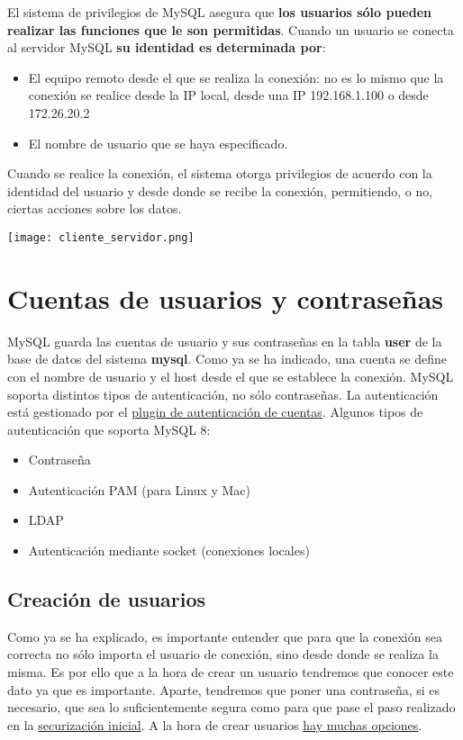 El sistema de privilegios de MySQL asegura que \textbf{los usuarios sólo pueden realizar las funciones que le son permitidas}. Cuando un usuario se conecta al servidor MySQL \textbf{su identidad es determinada por}:

\begin{itemize}
    \item El equipo remoto desde el que se realiza la conexión: no es lo mismo que la conexión se realice desde la IP local, desde una IP 192.168.1.100 o desde 172.26.20.2
    \item El nombre de usuario que se haya especificado.
\end{itemize}

Cuando se realice la conexión, el sistema otorga privilegios de acuerdo con la  identidad del usuario y desde donde se recibe la conexión, permitiendo, o no, ciertas acciones sobre los datos.

\begin{center}
    \vspace{-10pt}
    \texttt{[image: cliente\_servidor.png]}
\end{center}


\section{Cuentas de usuarios y contraseñas}
MySQL guarda las cuentas de usuario y sus contraseñas en la tabla \textbf{user} de la base de datos del sistema \textbf{mysql}. Como ya se ha indicado, una cuenta se define con el nombre de usuario y el host desde el que se establece la conexión. MySQL soporta distintos tipos de autenticación, no sólo contraseñas. La autenticación está gestionado por el \href{https://dev.mysql.com/doc/refman/8.0/en/authentication-plugins.html}{plugin de autenticación de cuentas}. Algunos tipos de autenticación que soporta MySQL 8:

\begin{itemize}
    \item Contraseña
    \item Autenticación PAM (para Linux y Mac)
    \item LDAP
    \item Autenticación mediante socket (conexiones locales)
\end{itemize}


\subsection{Creación de usuarios}
Como ya se ha explicado, es importante entender que para que la conexión sea correcta no sólo importa el usuario de conexión, sino desde donde se realiza la misma. Es por ello que a la hora de crear un usuario tendremos que conocer este dato ya que es importante. Aparte, tendremos que poner una contraseña, si es necesario, que sea lo suficientemente segura como para que pase el paso realizado en la \hyperlink{securizar_configuracion_inicial}{securización inicial}. A la hora de crear usuarios \href{https://dev.mysql.com/doc/refman/8.0/en/create-user.html}{hay muchas opciones}.



